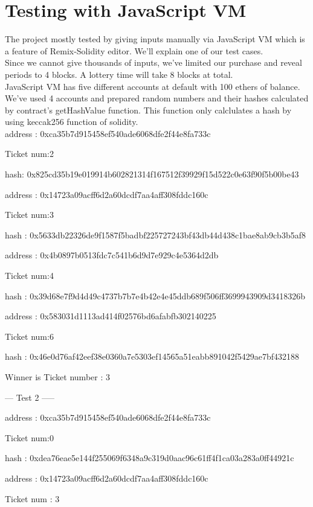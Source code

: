 \documentclass[]{scrreprt}
\begin{document}
		\section{Testing with JavaScript VM}
		The project mostly tested by giving inputs manually via JavaScript VM which is a feature of Remix-Solidity editor. We'll explain one of our test cases.\\
		Since we cannot give thousands of inputs, we've limited our purchase and reveal periods to 4 blocks. A lottery time will take 8 blocks at total. \\
		JavaScript VM has five different accounts at default with 100 ethers of balance. We've used 4 accounts and prepared random numbers and their hashes calculated by contract's getHashValue function. This function only calclulates a hash by using keccak256 function of solidity.\\

		address : 0xca35b7d915458ef540ade6068dfe2f44e8fa733c
		
		Ticket num:2 
		
		hash: 0x825cd35b19e019914b602821314f167512f39929f15d522c0e63f90f5b00be43

		address : 0x14723a09acff6d2a60dcdf7aa4aff308fddc160c
		
		Ticket num:3 
		
		hash : 0x5633db22326de9f1587f5badbf225727243bf43db44d438c1bae8ab9cb3b5af8

		address : 0x4b0897b0513fdc7c541b6d9d7e929c4e5364d2db
		
		Ticket num:4 
		
		hash : 0x39d68e7f9d4d49c4737b7b7e4b42e4e45ddb689f506ff3699943909d3418326b

		address : 0x583031d1113ad414f02576bd6afabfb302140225
		
		Ticket num:6 
		
		hash : 0x46e0d76af42eef38e0360a7e5303ef14565a51eabb891042f5429ae7bf432188

		Winner is Ticket number : 3

		--- Test 2 -----

		address : 0xca35b7d915458ef540ade6068dfe2f44e8fa733c
		
		Ticket num:0 
		
		hash : 0xdea76eae5e144f255069f6348a9c319d0aac96c61ff4f1ca03a283a0ff44921c

		address : 0x14723a09acff6d2a60dcdf7aa4aff308fddc160c
		
		Ticket num : 3
		
\end{document}
